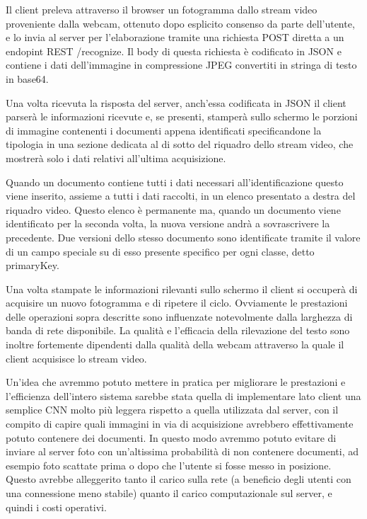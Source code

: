\documentclass[12pt,a4paper]{article}
\begin{document}
Il client preleva attraverso il browser un fotogramma dallo stream video
proveniente dalla webcam, ottenuto dopo esplicito consenso da parte
dell'utente, e lo invia al server per l'elaborazione tramite una
richiesta POST diretta a un endopint REST /recognize. Il body di questa
richiesta è codificato in JSON e contiene i dati dell'immagine in
compressione JPEG convertiti in stringa di testo in base64.

Una volta ricevuta la risposta del server, anch'essa codificata in JSON
il client parserà le informazioni ricevute e, se presenti, stamperà
sullo schermo le porzioni di immagine contenenti i documenti appena
identificati specificandone la tipologia in una sezione dedicata al di
sotto del riquadro dello stream video, che mostrerà solo i dati relativi
all'ultima acquisizione.

Quando un documento contiene tutti i dati necessari all'identificazione
questo viene inserito, assieme a tutti i dati raccolti, in un elenco
presentato a destra del riquadro video. Questo elenco è permanente ma,
quando un documento viene identificato per la seconda volta, la nuova
versione andrà a sovrascrivere la precedente. Due versioni dello stesso
documento sono identificate tramite il valore di un campo speciale su di
esso presente specifico per ogni classe, detto primaryKey.

Una volta stampate le informazioni rilevanti sullo schermo il client si
occuperà di acquisire un nuovo fotogramma e di ripetere il ciclo.
Ovviamente le prestazioni delle operazioni sopra descritte sono
influenzate notevolmente dalla larghezza di banda di rete disponibile.
La qualità e l'efficacia della rilevazione del testo sono inoltre
fortemente dipendenti dalla qualità della webcam attraverso la quale il
client acquisisce lo stream video.

Un'idea che avremmo potuto mettere in pratica per migliorare le
prestazioni e l'efficienza dell'intero sistema sarebbe stata quella di
implementare lato client una semplice CNN molto più leggera rispetto a
quella utilizzata dal server, con il compito di capire quali immagini in
via di acquisizione avrebbero effettivamente potuto contenere dei
documenti. In questo modo avremmo potuto evitare di inviare al server
foto con un'altissima probabilità di non contenere documenti, ad esempio
foto scattate prima o dopo che l'utente si fosse messo in posizione.
Questo avrebbe alleggerito tanto il carico sulla rete (a beneficio degli
utenti con una connessione meno stabile) quanto il carico computazionale
sul server, e quindi i costi operativi.
\end{document}
